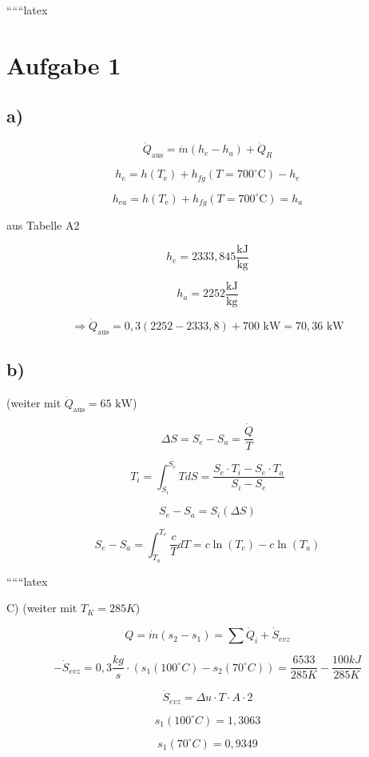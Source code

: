 
``````latex


\section*{Aufgabe 1}

\subsection*{a)}

\[
\dot{Q}_{\text{aus}} = \dot{m} (h_e - h_a) + \dot{Q}_R
\]

\[
h_e = h \left( T_{\text{e}} \right) + h_{fg} \left( T = 700^\circ \text{C} \right) - h_e
\]

\[
h_{ea} = h \left( T_{\text{e}} \right) + h_{fg} \left( T = 700^\circ \text{C} \right) = h_a
\]

aus Tabelle A2

\[
h_e = 2333,845 \frac{\text{kJ}}{\text{kg}}
\]

\[
h_a = 2252 \frac{\text{kJ}}{\text{kg}}
\]

\[
\Rightarrow \dot{Q}_{\text{aus}} = 0,3 \left( 2252 - 2333,8 \right) + 700 \text{ kW} = 70,36 \text{ kW}
\]

\subsection*{b)}

(weiter mit \(\dot{Q}_{\text{aus}} = 65 \text{ kW}\))

\[
\Delta S = S_e - S_a = \frac{\dot{Q}}{T}
\]

\[
T_i = \int_{S_i}^{S_e} T dS = \frac{S_e \cdot T_i - S_e \cdot T_a}{S_i - S_e}
\]

\[
S_e - S_a = S_i \left( \Delta S \right)
\]

\[
S_e - S_a = \int_{T_a}^{T_e} \frac{c}{T} dT = c \ln \left( T_e \right) - c \ln \left( T_a \right)
\]

``````latex


C) (weiter mit $T_K = 285K$)

\[
Q = \dot{m}(s_2 - s_1) = \sum \dot{Q}_i + \dot{S}_{evz}
\]

\[
- \dot{S}_{evz} = 0,3 \frac{kg}{s} \cdot (s_1(100^\circ C) - s_2(70^\circ C)) = \frac{6533}{285K} - \frac{100kJ}{285K}
\]

\[
\dot{S}_{evz} = \Delta u \cdot T \cdot A \cdot 2
\]

\[
s_1(100^\circ C) = 1,3063
\]

\[
s_1(70^\circ C) = 0,9349
\]

